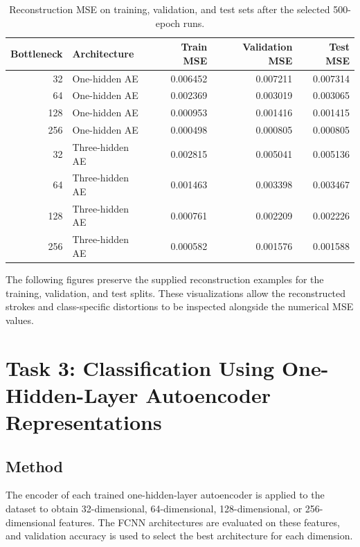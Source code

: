 \documentclass[conference,onecolumn]{IEEEtran}
\begin{document}
\begin{table}[H]
\centering
\small
\caption{Reconstruction MSE on training, validation, and test sets after the selected 500-epoch runs.}
\label{tab:ae-mse}
\begin{tabular}{r l r r r}
\toprule
Bottleneck & Architecture & Train MSE & Validation MSE & Test MSE\\
\midrule
32 & One-hidden AE & 0.006452 & 0.007211 & 0.007314 \\
64 & One-hidden AE & 0.002369 & 0.003019 & 0.003065 \\
128 & One-hidden AE & 0.000953 & 0.001416 & 0.001415 \\
256 & One-hidden AE & 0.000498 & 0.000805 & 0.000805 \\
32 & Three-hidden AE & 0.002815 & 0.005041 & 0.005136 \\
64 & Three-hidden AE & 0.001463 & 0.003398 & 0.003467 \\
128 & Three-hidden AE & 0.000761 & 0.002209 & 0.002226 \\
256 & Three-hidden AE & 0.000582 & 0.001576 & 0.001588 \\
\bottomrule
\end{tabular}
\end{table}

The following figures preserve the supplied reconstruction examples for the training, validation, and test splits. These visualizations allow the reconstructed strokes and class-specific distortions to be inspected alongside the numerical MSE values.


\FloatBarrier

\section{Task 3: Classification Using One-Hidden-Layer Autoencoder Representations}
\subsection{Method}
The encoder of each trained one-hidden-layer autoencoder is applied to the dataset to obtain 32-dimensional, 64-dimensional, 128-dimensional, or 256-dimensional features. The FCNN architectures are evaluated on these features, and validation accuracy is used to select the best architecture for each dimension.
\end{document}
